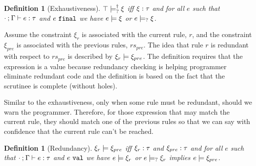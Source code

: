 \documentclass[acmsmall,screen,review,nonacm]{acmart}
\theoremstyle{slplain}
\numberwithin{thm}{section}
\newtheorem{defn}[thm]{Definition}
\begin{document}
\begin{defn}[Exhaustiveness]
  \label{defn:exhaustiveness}
  $\top \models_{?}^{\dag} \xi$ iff $\xi : \tau$ and for all $e$ such that $\cdot \mathbin{;} \Gamma \vdash e : \tau$ and $e ~\mathtt{final}$ we have $e \models \xi$ or $e \models_{?} \xi$.
\end{defn}

Assume the constraint $\xi_r$ is associated with the current rule, $r$, and the constraint $\xi_{pre}$ is associated with the previous rules, $rs_{pre}$. The idea that rule $r$ is redundant with respect to $rs_{pre}$ is described by $\xi_r \models \xi_{pre}$.
The definition requires that the expression is a value because redundancy checking is helping programmer eliminate redundant code and the definition is based on the fact that the scrutinee is complete (without holes).

Similar to the exhaustiveness, only when some rule must be redundant, should we warn the programmer. Therefore, for those expression that may match the current rule, they should match one of the previous rules so that we can say with confidence that the current rule can't be reached.
\begin{defn}[Redundancy]
  \label{defn:redundancy}
  $\xi_r \models \xi_{pre}$ iff $\xi_r : \tau$ and $\xi_{pre} : \tau$ and for all $e$ such that $\cdot \mathbin{;} \Gamma \vdash e : \tau$ and $e ~\mathtt{val}$ we have $e \models \xi_r$ or $e \models_{?} \xi_r$ implies $e \models \xi_{pre}$.
\end{defn}

\clearpage



\end{document}
